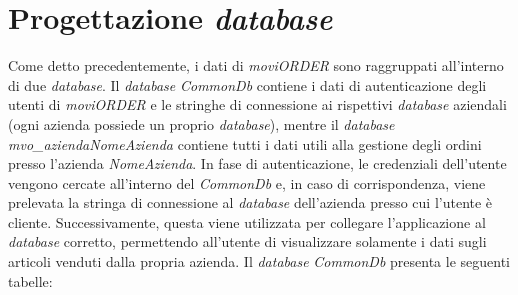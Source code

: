 \section{Progettazione \textit{database}} \label{progdb}

Come detto precedentemente, i dati di \textit{moviORDER} sono raggruppati all'interno di due \textit{database}. Il \textit{database} \textit{CommonDb} contiene i dati di autenticazione degli utenti di \textit{moviORDER} e le stringhe di connessione ai rispettivi \textit{database} aziendali (ogni azienda possiede un proprio \textit{database}), mentre il \textit{database} \textit{mvo\_aziendaNomeAzienda} contiene tutti i dati utili alla gestione degli ordini presso l'azienda \textit{NomeAzienda}. In fase di autenticazione, le credenziali dell'utente vengono cercate all'interno del \textit{CommonDb} e, in caso di corrispondenza, viene prelevata la stringa di connessione al \textit{database} dell'azienda presso cui l'utente è cliente. Successivamente, questa viene utilizzata per collegare l'applicazione al \textit{database} corretto, permettendo all'utente di visualizzare solamente i dati sugli articoli venduti dalla propria azienda.
Il \textit{database} \textit{CommonDb} presenta le seguenti tabelle:
